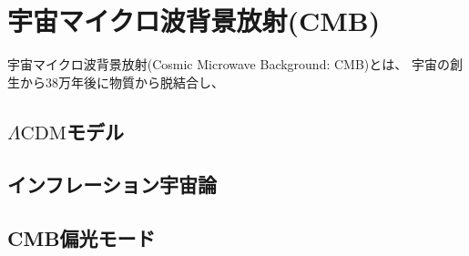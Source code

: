 \documentclass[../../main.tex]{subfiles}
\begin{document}
\chapter{宇宙マイクロ波背景放射(CMB)}
宇宙マイクロ波背景放射(Cosmic Microwave Background: CMB)とは、
宇宙の創生から38万年後に物質から脱結合し、

\section{$\Lambda\mathrm{CDM}$モデル}

\section{インフレーション宇宙論}

\section{CMB偏光モード}
\end{document}
